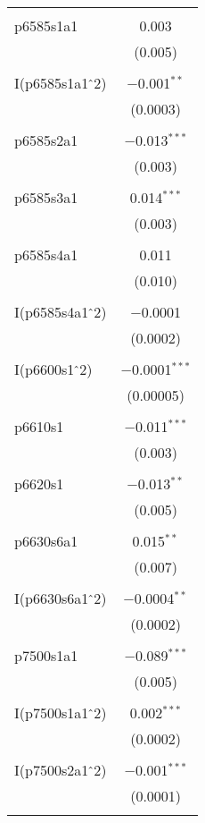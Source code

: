 \begin{table}[!htbp]
\begin{tabular}{@{\extracolsep{5pt}}lc}
  & \\ 
 p6585s1a1 & 0.003 \\ 
  & (0.005) \\ 
  & \\ 
 I(p6585s1a1$\hat{\mkern6mu}$2) & $-$0.001$^{**}$ \\ 
  & (0.0003) \\ 
  & \\ 
 p6585s2a1 & $-$0.013$^{***}$ \\ 
  & (0.003) \\ 
  & \\ 
 p6585s3a1 & 0.014$^{***}$ \\ 
  & (0.003) \\ 
  & \\ 
 p6585s4a1 & 0.011 \\ 
  & (0.010) \\ 
  & \\ 
 I(p6585s4a1$\hat{\mkern6mu}$2) & $-$0.0001 \\ 
  & (0.0002) \\ 
  & \\ 
 I(p6600s1$\hat{\mkern6mu}$2) & $-$0.0001$^{***}$ \\ 
  & (0.00005) \\ 
  & \\ 
 p6610s1 & $-$0.011$^{***}$ \\ 
  & (0.003) \\ 
  & \\ 
 p6620s1 & $-$0.013$^{**}$ \\ 
  & (0.005) \\ 
  & \\ 
 p6630s6a1 & 0.015$^{**}$ \\ 
  & (0.007) \\ 
  & \\ 
 I(p6630s6a1$\hat{\mkern6mu}$2) & $-$0.0004$^{**}$ \\ 
  & (0.0002) \\ 
  & \\ 
 p7500s1a1 & $-$0.089$^{***}$ \\ 
  & (0.005) \\ 
  & \\ 
 I(p7500s1a1$\hat{\mkern6mu}$2) & 0.002$^{***}$ \\ 
  & (0.0002) \\ 
  & \\ 
 I(p7500s2a1$\hat{\mkern6mu}$2) & $-$0.001$^{***}$ \\ 
  & (0.0001) \\ 
  & \\ 

\end{tabular}
\end{table}
